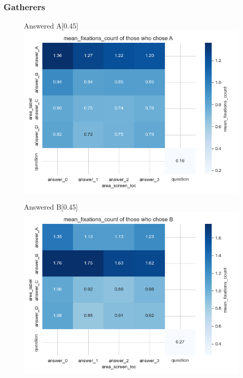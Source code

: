 \documentclass{article}
\begin{document}
\subsubsection{Gatherers}

\begin{figure}[H]
  \centering
  \begin{subcaptionbox}{Answered A\label{fig:A_fc_g}}[0.45\textwidth]
    {\centering\includegraphics[width=\linewidth]{plots/matrix_plots/matrix_mean_fixations_count_A_gatherers.png}}
  \end{subcaptionbox}
  \hfill
  \begin{subcaptionbox}{Answered B\label{fig:B_fc_g}}[0.45\textwidth]
    {\centering\includegraphics[width=\linewidth]{plots/matrix_plots/matrix_mean_fixations_count_B_gatherers.png}}
  \end{subcaptionbox}
  

\end{figure}
\end{document}

